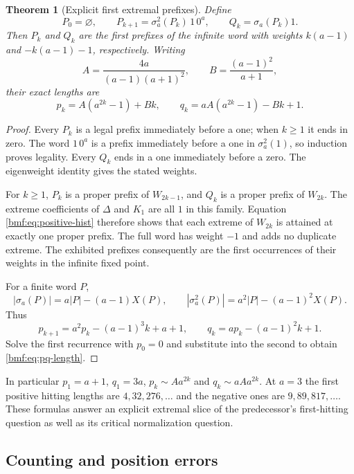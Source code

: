 \documentclass[11pt]{article}
\numberwithin{equation}{section}
\newtheorem{theorem}{Theorem}[section]
\theoremstyle{definition}
\theoremstyle{remark}
\begin{document}
\begin{theorem}[Explicit first extremal prefixes]\label{bmf:thm:first-hit}
Define
\begin{equation}\label{bmf:eq:PQ}
 P_0=\varnothing,\qquad P_{k+1}=\sigma_a^2(P_k)\,1\,0^a,
 \qquad Q_k=\sigma_a(P_k)1.
\end{equation}
Then $P_k$ and $Q_k$ are the first prefixes of the infinite word
with weights $k(a-1)$ and $-k(a-1)-1$, respectively.
Writing
\begin{equation}\label{bmf:eq:ab-length}
 A=\frac{4a}{(a-1)(a+1)^2},\qquad
 B=\frac{(a-1)^2}{a+1},
\end{equation}
their exact lengths are
\begin{equation}\label{bmf:eq:pq-length}
 p_k=A(a^{2k}-1)+Bk,\qquad
 q_k=aA(a^{2k}-1)-Bk+1.
\end{equation}
\end{theorem}
\begin{proof}
Every $P_k$ is a legal prefix immediately before a one; when
$k\geq1$ it ends in zero. The word $1\,0^a$ is a prefix
immediately before a one in $\sigma_a^2(1)$, so induction
proves legality. Every $Q_k$ ends in a one immediately before
a zero. The eigenweight identity gives the stated weights.

For $k\geq1$, $P_k$ is a proper prefix of $W_{2k-1}$,
and $Q_k$ is a proper prefix of $W_{2k}$. The extreme
coefficients of $\Delta$ and $K_1$ are all $1$ in this family.
Equation \eqref{bmf:eq:positive-hist} therefore shows that each
extreme of $W_{2k}$ is attained at exactly one proper prefix.
The full word has weight $-1$ and adds no duplicate extreme.
The exhibited prefixes consequently are the first occurrences
of their weights in the infinite fixed point.

For a finite word $P$,
\[
 |\sigma_a(P)|=a|P|-(a-1)X(P),\qquad
 |\sigma_a^2(P)|=a^2|P|-(a-1)^2X(P).
\]
Thus
\[
 p_{k+1}=a^2p_k-(a-1)^3k+a+1,\qquad
 q_k=ap_k-(a-1)^2k+1.
\]
Solve the first recurrence with $p_0=0$ and substitute into
the second to obtain \eqref{bmf:eq:pq-length}.
\end{proof}

In particular $p_1=a+1$, $q_1=3a$,
$p_k\sim Aa^{2k}$ and $q_k\sim aAa^{2k}$.
At $a=3$ the first positive hitting lengths are
$4,32,276,\ldots$ and the negative ones are
$9,89,817,\ldots$. These formulas answer an explicit extremal
slice of the predecessor's first-hitting question as well as
its critical normalization question.

\subsection{Counting and position errors}
\end{document}
